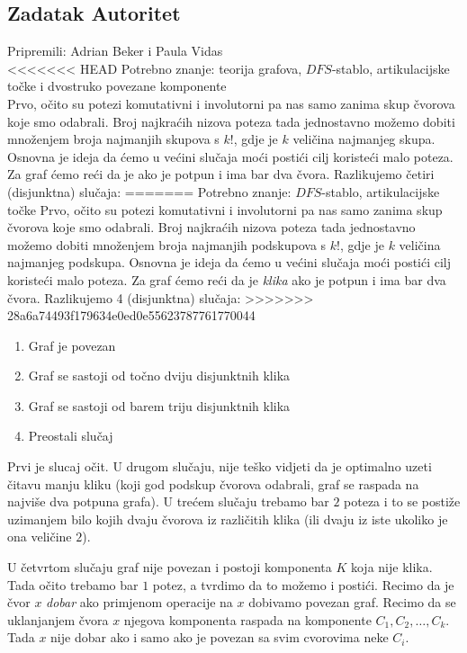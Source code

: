 \subsection*{Zadatak Autoritet}
\textsf{Pripremili: Adrian Beker i Paula Vidas}\\
<<<<<<< HEAD
\textsf{Potrebno znanje: teorija grafova, $DFS$-stablo, artikulacijske točke i dvostruko povezane komponente}\\
Prvo, očito su potezi komutativni i involutorni pa nas samo zanima skup čvorova koje smo odabrali. Broj najkraćih nizova poteza tada jednostavno možemo dobiti množenjem broja najmanjih skupova s $k!$, gdje je $k$ veličina najmanjeg skupa. Osnovna je ideja da ćemo u većini slučaja moći postići cilj koristeći malo poteza. Za graf ćemo reći da je  ako je potpun i ima bar dva čvora. Razlikujemo četiri (disjunktna) slučaja:
=======
\textsf{Potrebno znanje: $DFS$-stablo, artikulacijske točke}
Prvo, očito su potezi komutativni i involutorni pa nas samo zanima skup čvorova
koje smo odabrali. Broj najkraćih nizova poteza tada jednostavno možemo dobiti
množenjem broja najmanjih podskupova s $k!$, gdje je $k$ veličina najmanjeg
podskupa. Osnovna je ideja da ćemo u većini slučaja moći postići cilj koristeći
malo poteza. Za graf ćemo reći da je \textit{klika} ako je potpun i ima bar dva čvora. Razlikujemo 4 (disjunktna) slučaja:
>>>>>>> 28a6a74493f179634e0ed0e55623787761770044

\begin{enumerate}
    \item Graf je povezan
    \item Graf se sastoji od točno dviju disjunktnih klika
    \item Graf se sastoji od barem triju disjunktnih klika
    \item Preostali slučaj
\end{enumerate}
Prvi je slucaj očit. U drugom slučaju, nije teško vidjeti da je optimalno uzeti čitavu manju kliku (koji god podskup čvorova odabrali, graf se raspada na najviše dva potpuna grafa).
U trećem slučaju trebamo bar $2$ poteza i to se postiže uzimanjem bilo kojih dvaju čvorova iz različitih klika (ili dvaju iz iste ukoliko je ona veličine $2$).

U četvrtom slučaju graf nije povezan i postoji komponenta $K$ koja nije klika. Tada očito trebamo bar $1$ potez, a tvrdimo da to možemo i postići. Recimo da je čvor $x$ \textit{dobar} ako primjenom operacije na $x$ dobivamo povezan graf. Recimo da se uklanjanjem čvora $x$ njegova komponenta raspada na komponente $C_1, C_2, …, C_k$. Tada $x$ nije dobar ako i samo ako je povezan sa svim cvorovima neke $C_i$.

